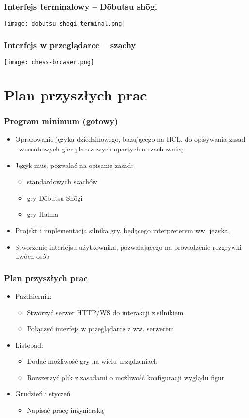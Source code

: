 \documentclass{beamer}
\begin{document}
\begin{frame}
	\frametitle{Interfejs terminalowy -- Dōbutsu shōgi}
	\centering
	\texttt{[image: dobutsu-shogi-terminal.png]}
\end{frame}

\begin{frame}
	\frametitle{Interfejs w przeglądarce -- szachy}
	\centering
	\texttt{[image: chess-browser.png]}
\end{frame}

\section{Plan przyszłych prac}

\begin{frame}
	\frametitle{Program minimum (gotowy)}
	\begin{itemize}
		\item Opracowanie języka dziedzinowego, bazującego na HCL, do opisywania zasad dwuosobowych gier planszowych opartych o szachownicę
		\item Język musi pozwalać na opisanie zasad:
		      \begin{itemize}
			      \item standardowych szachów
			      \item gry Dōbutsu Shōgi
			      \item gry Halma
		      \end{itemize}
		\item Projekt i implementacja silnika gry, będącego interpreterem ww. języka,
		\item Stworzenie interfejsu użytkownika, pozwalającego na prowadzenie rozgrywki dwóch osób
	\end{itemize}
\end{frame}

\begin{frame}
	\frametitle{Plan przyszłych prac}
	\begin{itemize}
		\item Październik:
		      \begin{itemize}
			      \item Stworzyć serwer HTTP/WS do interakcji z silnikiem
			      \item Połączyć interfejs w przeglądarce z ww. serwerem
		      \end{itemize}
		\item Listopad:
		      \begin{itemize}
			      \item Dodać możliwość gry na wielu urządzeniach
			      \item Rozszerzyć plik z zasadami o możliwość konfiguracji wyglądu figur
		      \end{itemize}
		\item Grudzień i styczeń
		      \begin{itemize}
			      \item Napisać pracę inżynierską
		      \end{itemize}
	\end{itemize}
\end{frame}
\end{document}

